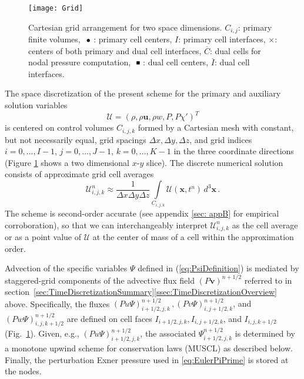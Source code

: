 \documentclass{ametsoc}
\newcommand{\sblue}[1]{\textcolor{sblue}{#1}}
\newcommand{\revision}[1]{\sblue{#1}}
\theoremstyle{definition}
\newcommand{\eq}[1]{(\ref{#1})}
\newcommand{\vect}[1]{{\mathbf{#1}}}
\newcommand{\vu}{\vect{u}}
\newcommand{\vv}{\vect{v}}
\newcommand{\vx}{\vect{x}}
\newcommand{\half}{1/2}
\newcommand{\dz}{\Delta z}
\newcommand{\chiprime}{{\chi'}}
\newcommand{\Sol}{\mathcal{U}}
\newcommand{\dx}{{\Delta x}}
\newcommand{\dy}{{\Delta y}}
\begin{document}
\begin{figure}
\centering
 \texttt{[image: Grid]}
\caption{Cartesian grid arrangement for two space dimensions. 
$C_{i,j}$: primary finite volumes, 
$\ \bullet\ $: primary cell centers, $I$: primary cell interfaces,
$\times$: centers of both primary and dual cell interfaces, 
$\overline{C}$: dual cells for nodal pressure computation, $\ \rule[1pt]{4pt}{4pt}\ $:
dual cell centers, $\overline{I}$: dual cell interfaces.
\label{fig:GridArrangement}}
\end{figure}

The space discretization of the present scheme for the primary
and auxiliary solution variables 
%
\begin{equation}
\Sol = \left(\rho, \rho\vu, \rho w, P, P\chiprime \right)^T
\end{equation}
%
is centered on control volumes $C_{i,j,k}$ formed by a Cartesian mesh with constant,
but not necessarily equal, grid spacings $\dx, \dy, \dz$, and grid indices 
$i = 0, ..., I-1$, $j = 0, ..., J-1$, $k = 0, ..., K-1$ in the three coordinate directions (Figure \ref{fig:GridArrangement} shows a two dimensional $x$-$y$ slice). 
The discrete numerical solution consists of approximate grid cell averages 
%
\begin{equation}
\Sol_{i,j,k}^n \approx 
\frac{1}{\dx \dy \dz}\int\limits_{C_{i,j,k}} \Sol(\vx,t^n)\, d^3\vx\,.
\end{equation}
%
The scheme is second-order accurate \revision{(see appendix \ref{sec: appB} for empirical corroboration)}, 
so that we can interchangeably interpret 
$\Sol_{i,j,k}^n$ as the cell average or as a point value of $\Sol$ at the center of 
mass of a cell within the approximation order.  

Advection of the specific variables $\Psi$ defined in \eq{eq:PsiDefinition} is mediated 
by staggered-grid components of the advective flux field $(P\vv)^{n+\half}$ referred
to in section~\ref{sec:TimeDiscretizationSummary}\ref{ssec:TimeDiscretizationOverview} 
above. Specifically, the fluxes
%
\revision{$(Pu \Psi)^{n+\half}_{i+\half,j,k}\,,
(Pv \Psi)^{n+\half}_{i,j+\half,k}$, and
$(Pw \Psi)^{n+\half}_{i,j,k+\half}$
are defined on cell faces $I_{i+\half,j,k}, I_{i,j+\half,k}$, and $I_{i,j,k+\half}$ 
(Fig.~\ref{fig:GridArrangement}). 
Given, e.g., $(Pu \Psi)^{n+\half}_{i+\half,j,k}$, the associated $\Psi^{n+\half}_{i+\half,j,k}$ 
is determined by a monotone upwind scheme for conservation laws (MUSCL)  
\citep{vanLeer2006} as described below. Finally, the perturbation Exner pressure used in 
\eqref{eq:EulerPiPrime} is stored at the nodes.}
\end{document}
